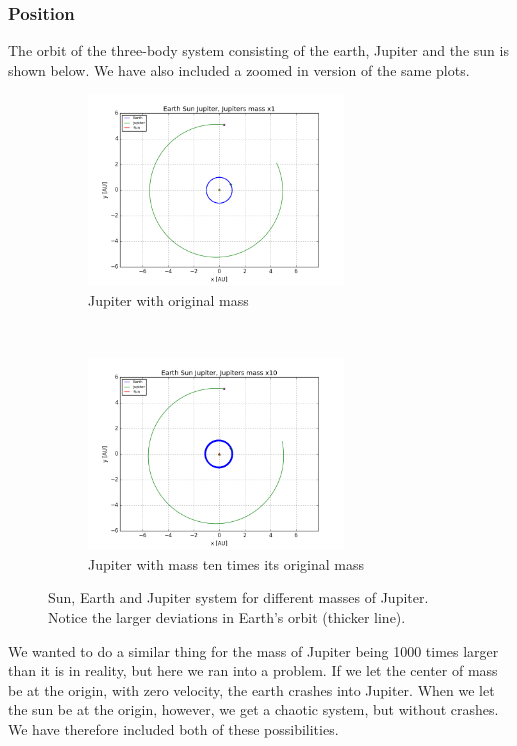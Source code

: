 \documentclass[a4paper, 10pt]{article}
\begin{document}
\subsubsection{Position}
The orbit of the three-body system consisting of the earth, Jupiter and the sun is shown below. We have also included a zoomed in version of the same plots.
\begin{figure}[t!]
    \centering
    \begin{subfigure}[t]{0.5\textwidth}
        \centering
        \includegraphics[height=2.0in]{orbitESJ1.png}
        \caption{Jupiter with original mass}
    \end{subfigure}%
    ~ 
    \begin{subfigure}[t]{0.5\textwidth}
        \centering
        \includegraphics[height=2.0in]{orbitESJ10.png}
        \caption{Jupiter with mass ten times its original mass}
    \end{subfigure}
    \caption{Sun, Earth and Jupiter system for different masses of Jupiter. Notice the larger deviations in Earth's orbit (thicker line).} \label{fig:jupiter1-10}
\end{figure}
We wanted to do a similar thing for the mass of Jupiter being 1000 times larger than it is in reality, but here we ran into a problem. If we let the center of mass be at the origin, with zero velocity, the earth crashes into Jupiter. When we let the sun be at the origin, however, we get a chaotic system, but without crashes. We have therefore included both of these possibilities.
\end{document}
